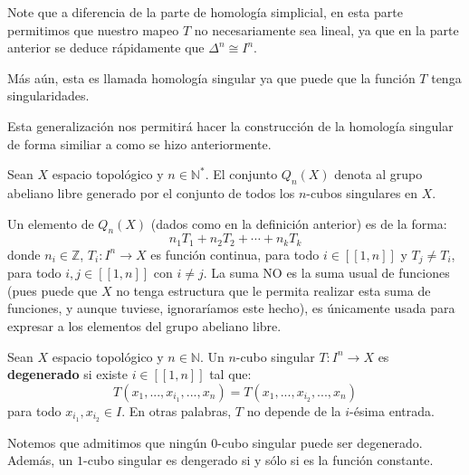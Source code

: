 \documentclass[12pt]{report}
\newcounter{it}
\theoremstyle{largebreak}
\newcommand\cf[3]{\ensuremath{#1:#2\rightarrow#3}}
\newcommand\natint[1]{\ensuremath{\left[\!\left[ #1\right]\!\right]}}
\begin{document}
    \begin{obs}
        Note que a diferencia de la parte de homología simplicial, en esta parte permitimos que nuestro mapeo $T$ no necesariamente sea lineal, ya que en la parte anterior se deduce rápidamente que $\Delta^n\cong I^n$.

        Más aún, esta es llamada homología singular ya que puede que la función $T$ tenga singularidades.
    \end{obs}

    Esta generalización nos permitirá hacer la construcción de la homología singular de forma similiar a como se hizo anteriormente.

    \begin{mydef}
        Sean $X$ espacio topológico y $n\in\mathbb{N}^*$. El conjunto $Q_n(X)$ denota al grupo abeliano libre generado por el conjunto de todos los $n$-cubos singulares en $X$.
    \end{mydef}

    \begin{obs}
        Un elemento de $Q_n(X)$ (dados como en la definición anterior) es de la forma:
        \begin{equation*}
            n_1T_1+n_2T_2+\cdots+n_kT_k
        \end{equation*}
        donde $n_i\in\mathbb{Z}$, $\cf{T_i}{I^n}{X}$ es función continua, para todo $i\in\natint{1,n}$ y $T_j\neq T_i$, para todo $i,j\in\natint{1,n}$ con $i\neq j$. La suma NO es la suma usual de funciones (pues puede que $X$ no tenga estructura que le permita realizar esta suma de funciones, y aunque tuviese, ignoraríamos este hecho), es únicamente usada para expresar a los elementos del grupo abeliano libre.
    \end{obs}

    \begin{mydef}
        Sean $X$ espacio topológico y $n\in\mathbb{N}$. Un $n$-cubo singular $\cf{T}{I^n}{X}$ es \textbf{degenerado} si existe $i\in\natint{1,n}$ tal que:
        \begin{equation*}
            T(x_1,...,x_{ i_1},...,x_n)=T(x_1,...,x_{ i_2},...,x_n)
        \end{equation*}
        para todo $x_{i_1},x_{i_2}\in I$. En otras palabras, $T$ no depende de la $i$-ésima entrada.
    \end{mydef}

    Notemos que admitimos que ningún $0$-cubo singular puede ser degenerado. Además, un $1$-cubo singular es dengerado si y sólo si es la función constante.
\end{document}
